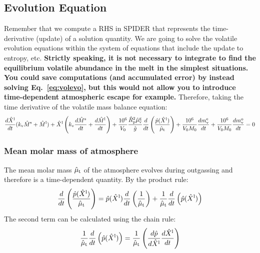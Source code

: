 \subsection{Evolution Equation}
Remember that we compute a RHS in SPIDER that represents the time-derivative (update) of a solution quantity.  We are going to solve the volatile evolution equations within the system of equations that include the update to entropy, etc.  \textbf{Strictly speaking, it is not necessary to integrate to find the equilibrium volatile abundance in the melt in the simplest situations.  You could save computations (and accumulated error) by instead solving Eq.~\ref{eq:volevo}, but this would not allow you to introduce time-dependent atmospheric escape for example.}  Therefore, taking the time derivative of the volatile mass balance equation:
\begin{equation}
\frac{d \hat{X}^{\rm l}}{d t} (k_{\rm v} \hat{M}^{\rm s} + \hat{M}^{\rm l}) + \hat{X}^{\rm l} \left( k_{\rm v} \frac{d \hat{M}^{\rm s}}{d t} + \frac{d \hat{M}^{\rm l}}{d t} \right) + \frac{10^6}{V_0} \frac{\hat{R}_{\rm p}^2 \hat{\mu}_{\rm v}^{\rm g}}{\hat{g}} \frac{d}{dt} \left( \frac{\hat{p}(\hat{X}^{\rm l})}{\hat{\mu}_{\rm t}} \right) + \frac{10^6}{V_0 M_0} \frac{dm_{\rm v}^{\rm e}}{dt} + \frac{10^6}{V_0 M_0} \frac{dm_{\rm v}^{\rm o}}{dt} = 0
\end{equation}
\subsubsection{Mean molar mass of atmosphere}
The mean molar mass $\hat{\mu}_{\rm t}$ of the atmosphere evolves during outgassing and therefore is a time-dependent quantity.  By the product rule:
\begin{equation}
\frac{d}{dt} \left( \frac{\hat{p}(\hat{X}^{\rm l})}{\hat{\mu}_{\rm t}} \right) = \hat{p}(\hat{X}^{\rm l}) \frac{d}{dt} \left( \frac{1}{\hat{\mu}_{\rm t}} \right) + \frac{1}{\hat{\mu}_{\rm t}} \frac{d}{dt} \left( \hat{p}(\hat{X}^{\rm l}) \right)
\label{eq:atmos_evo}
\end{equation}
The second term can be calculated using the chain rule:
\begin{equation}
\frac{1}{\hat{\mu}_{\rm t}} \frac{d}{dt} \left( \hat{p}(\hat{X}^{\rm l}) \right) = \frac{1}{\hat{\mu}_{\rm t}} \left( \frac{d \hat{p}}{d \hat{X}^{\rm l}} \frac{d \hat{X}^{\rm l}}{d t} \right)
\end{equation}
